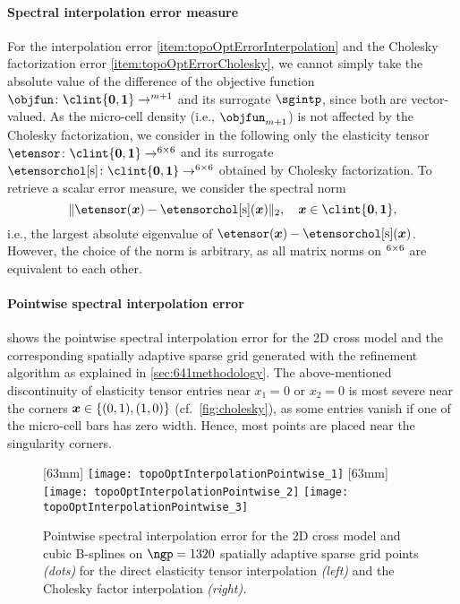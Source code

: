 \paragraph{Spectral interpolation error measure}

For the interpolation error \ref{item:topoOptErrorInterpolation} and
the Cholesky factorization error \ref{item:topoOptErrorCholesky},
we cannot simply take the absolute value of the difference
of the objective function $\*\objfun\colon \clint{\*0, \*1} \to \real^{m+1}$
and its surrogate $\*\sgintp$, since both are vector-valued.
As the micro-cell density (i.e., $\objfun_{m+1}$)
is not affected by the Cholesky factorization,
we consider in the following only the elasticity tensor
$\etensor\colon \clint{\*0, \*1} \to \real^{6 \times 6}$ and
its surrogate
$\etensorcholintp\colon \clint{\*0, \*1} \to \real^{6 \times 6}$
obtained by Cholesky factorization.
To retrieve a scalar error measure,
we consider the spectral norm
\begin{equation}
  \norm[2]{\etensor(\*x) - \etensorcholintp(\*x)},\quad
  \*x \in \clint{\*0, \*1},
\end{equation}
i.e., the largest absolute eigenvalue of
$\etensor(\*x) - \etensorcholintp(\*x)$.
However, the choice of the norm is arbitrary,
as all matrix norms on $\real^{6 \times 6}$ are equivalent to each other.

\paragraph{Pointwise spectral interpolation error}

shows the pointwise spectral interpolation error for the 2D cross model
and the corresponding spatially adaptive sparse grid
generated with the refinement algorithm as explained in
\cref{sec:641methodology}.
The above-mentioned discontinuity of elasticity tensor entries
near $x_1 = 0$ or $x_2 = 0$
is most severe near the corners ${\boldsymbol{x}} \in \{(0, 1), (1, 0)\}$
(cf.\ \cref{fig:cholesky}),
as some entries vanish if one of the micro-cell bars has zero width.
Hence, most points are placed near the singularity corners.

\begin{figure}
  [63mm]{%
    \texttt{[image: topoOptInterpolationPointwise\_1]}%
  }%
  \hspace{3mm}%
  [63mm]{%
    \texttt{[image: topoOptInterpolationPointwise\_2]}%
  }%
  \hfill%
  \texttt{[image: topoOptInterpolationPointwise\_3]}%
  \caption[Pointwise spectral interpolation error for the 2D cross model]{%
    Pointwise spectral interpolation error for the 2D cross model and
    cubic B-splines on
    $\ngp = 1320$ spatially adaptive sparse grid points \emph{(dots)} for
    the direct elasticity tensor interpolation \emph{(left)} and
    the Cholesky factor interpolation \emph{(right).}%
  }%
  \label{fig:topoOptInterpolationErrorPointwise}%
\end{figure}

